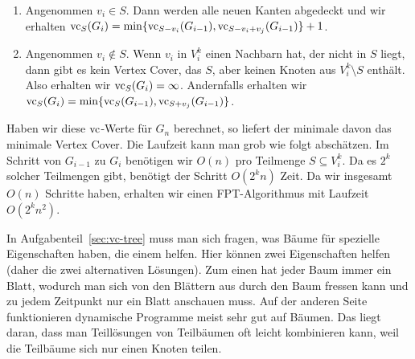 \begin{enumerate}[1.]
\item Angenommen $v_i \in S$.  Dann werden alle neuen Kanten abgedeckt
  und wir erhalten
  $\operatorname{vc}_S(G_i) = \min\{\operatorname{vc}_{S - v_i}(G_{i-1}), \operatorname{vc}_{S - v_i +
    v_j}(G_{i-1})\} + 1$.
\item Angenommen $v_i \notin S$.  Wenn $v_i$ in $V_i^k$ einen Nachbarn
  hat, der nicht in $S$ liegt, dann gibt es kein Vertex Cover, das $S$,
  aber keinen Knoten aus $V_i^k\setminus S$ enthält.  Also erhalten
  wir $\operatorname{vc}_S(G_i) = \infty$.  Andernfalls erhalten wir
  $\operatorname{vc}_S(G_i) = \min\{\operatorname{vc}_{S}(G_{i-1}), \operatorname{vc}_{S + v_j}(G_{i-1})\}$.
\end{enumerate}

Haben wir diese $\operatorname{vc}$-Werte für $G_n$ berechnet, so liefert der
minimale davon das minimale Vertex Cover.  Die Laufzeit kann man grob
wie folgt abschätzen.  Im Schritt von $G_{i-1}$ zu $G_i$ benötigen wir
$O(n)$ pro Teilmenge $S \subseteq V_i^k$.  Da es $2^k$ solcher
Teilmengen gibt, benötigt der Schritt $O(2^kn)$ Zeit.  Da wir insgesamt
$O(n)$ Schritte haben, erhalten wir einen FPT-Algorithmus mit Laufzeit
$O(2^kn^2)$.


\how

In Aufgabenteil~\ref{sec:vc-tree} muss man sich fragen, was Bäume für
spezielle Eigenschaften haben, die einem helfen.  Hier können zwei
Eigenschaften helfen (daher die zwei alternativen Lösungen).  Zum
einen hat jeder Baum immer ein Blatt, wodurch man sich von den
Blättern aus durch den Baum fressen kann und zu jedem Zeitpunkt nur
ein Blatt anschauen muss.  Auf der anderen Seite funktionieren
dynamische Programme meist sehr gut auf Bäumen.  Das liegt daran, dass
man Teillösungen von Teilbäumen oft leicht kombinieren kann, weil die
Teilbäume sich nur einen Knoten teilen.

